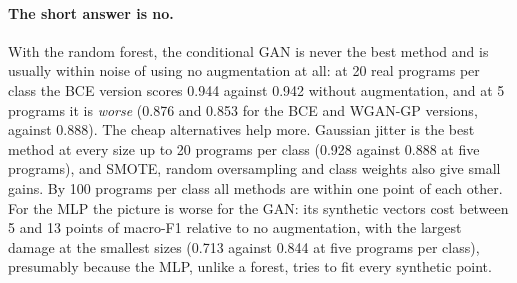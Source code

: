 \documentclass[conference]{IEEEtran}
\begin{document}
\begin{table}[t]
\centering
\caption{MLP: same protocol as Table~\ref{tab:augrf}.}
\label{tab:augmlp}
\footnotesize
{}
\end{table}

\paragraph{The short answer is no.} With the random forest, the conditional GAN is never the best method and is usually
within noise of using no augmentation at all: at 20 real programs per class the BCE version scores 0.944 against 0.942 without
augmentation, and at 5 programs it is \emph{worse} (0.876 and 0.853 for the BCE and WGAN-GP versions, against 0.888). The
cheap alternatives help more. Gaussian jitter is the best method at every size up to 20 programs per class (0.928 against
0.888 at five programs), and SMOTE, random oversampling and class weights also give small gains. By 100 programs per class
all methods are within one point of each other. For the MLP the picture is worse for the GAN: its synthetic vectors cost
between 5 and 13 points of macro-F1 relative to no augmentation, with the largest damage at the smallest sizes
(0.713 against 0.844 at five programs per class), presumably because the MLP, unlike a forest, tries to fit every synthetic point.
\end{document}
